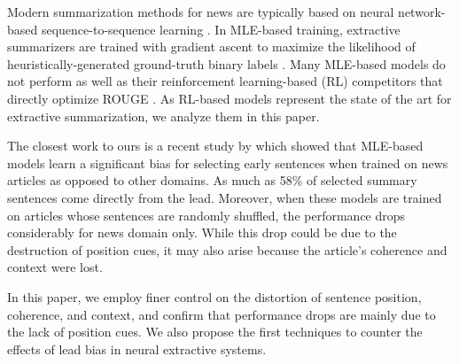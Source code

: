 
Modern summarization methods for news are typically
based on neural network-based sequence-to-sequence learning
\parencite{cnn1_kalchbrenner2014convolutional,cnn2_kim2014convolutional,rnn2_chung2014gru,ext2_2015Yin,ext3_cao2015learning,ext4_cheng2016neural,ext5_summarunner,narayan2018don,neusum}.
In MLE-based training, extractive summarizers are 
trained with gradient ascent to maximize the likelihood
of heuristically-generated ground-truth binary
labels \parencite{ext5_summarunner}. Many MLE-based models
do not perform as well as their reinforcement 
learning-based (RL) competitors that directly optimize ROUGE \parencite{abs5_paulus2017deep,DBLP:Narayan/2018,dong2018banditsum,DBLP:conf/aaai/WuH18}. 
As RL-based models represent the state of the art for 
extractive summarization, we analyze them in this paper.

The closest work to ours is a recent study by 
\cite{kedzie2018content} which showed that 
MLE-based models learn a significant bias for 
selecting early sentences when trained on news 
articles as opposed to other domains. As much as 
58\% of selected summary sentences come directly 
from the lead. Moreover, when these models
are trained on articles whose sentences
are randomly shuffled, the performance drops 
considerably for news domain only. While this drop 
could be due to the destruction of position cues, 
it may also arise because the article's coherence
and context were lost. 

In this paper, we employ finer control on the 
distortion of sentence position, coherence, and 
context, and confirm that performance drops are 
mainly due to the lack of position cues. 
We also propose the first techniques to 
counter the effects of lead bias in neural extractive systems.
